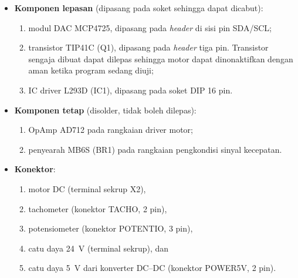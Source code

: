 \documentclass[11pt,a4paper]{article}
\begin{document}
\begin{itemize}
	\item \textbf{Komponen lepasan} (dipasang pada soket sehingga dapat dicabut):
	      \begin{enumerate}[label=(\arabic*)]
		      \item[(1)] modul DAC MCP4725, dipasang pada \textit{header} di sisi pin SDA/SCL;
		      \item[(3)] transistor TIP41C (Q1), dipasang pada \textit{header} tiga pin. Transistor sengaja dibuat dapat dilepas sehingga motor dapat dinonaktifkan dengan aman ketika program sedang diuji;
		      \item[(4)] IC driver L293D (IC1), dipasang pada soket DIP 16 pin.
	      \end{enumerate}
	\item \textbf{Komponen tetap} (disolder, tidak boleh dilepas):
	      \begin{enumerate}[label=(\arabic*)]
		      \item[(2)] OpAmp AD712 pada rangkaian driver motor;
		      \item[(5)] penyearah MB6S (BR1) pada rangkaian pengkondisi sinyal kecepatan.
	      \end{enumerate}
	\item \textbf{Konektor}:
	      \begin{enumerate}[label=(\Alph*)]
		      \item motor DC (terminal sekrup X2),
		      \item tachometer (konektor TACHO, 2 pin),
		      \item potensiometer (konektor POTENTIO, 3 pin),
		      \item catu daya 24~V (terminal sekrup), dan
		      \item catu daya 5~V dari konverter DC--DC (konektor POWER5V, 2 pin).
	      \end{enumerate}
\end{itemize}
\end{document}
